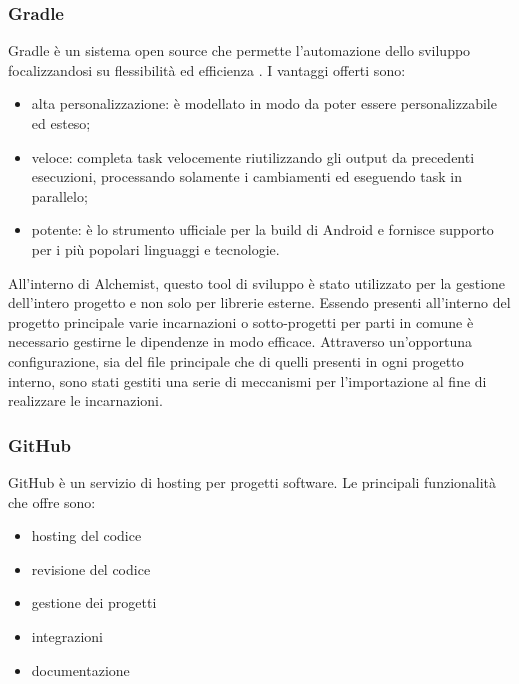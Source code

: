 \subsubsection{Gradle}
Gradle è un sistema open source che permette l'automazione dello sviluppo focalizzandosi su flessibilità ed efficienza \cite{Gradle}. I vantaggi offerti sono:
\begin{itemize}
\item alta personalizzazione: è modellato in modo da poter essere personalizzabile ed esteso;
\item veloce: completa task velocemente riutilizzando gli output da precedenti esecuzioni, processando solamente i cambiamenti ed eseguendo task in parallelo;
\item potente: è lo strumento ufficiale per la build di Android e fornisce supporto per i più popolari linguaggi e tecnologie.
\end{itemize}
All'interno di Alchemist, questo tool di sviluppo è stato utilizzato per la gestione dell'intero progetto e non solo per librerie esterne. Essendo presenti all'interno del progetto principale varie incarnazioni o sotto-progetti per parti in comune è necessario gestirne le dipendenze in modo efficace. Attraverso un'opportuna configurazione, sia del file principale che di quelli presenti in ogni progetto interno, sono stati gestiti una serie di meccanismi per l'importazione al fine di realizzare le incarnazioni.

\subsubsection{GitHub}
GitHub è un servizio di hosting per progetti software. Le principali funzionalità che offre sono:
\begin{itemize}
\item hosting del codice
\item revisione del codice
\item gestione dei progetti
\item integrazioni
\item documentazione
\end{itemize}

